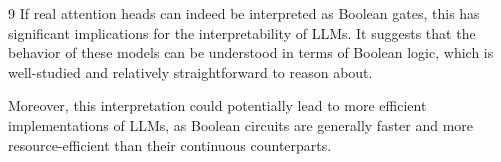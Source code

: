 \documentclass[11pt]{article}
\theoremstyle{definition}
\begin{document}
\begin{thebibliography}{9}
If real attention heads can indeed be interpreted as Boolean gates, this has significant implications for the interpretability of LLMs. It suggests that the behavior of these models can be understood in terms of Boolean logic, which is well-studied and relatively straightforward to reason about.













Moreover, this interpretation could potentially lead to more efficient implementations of LLMs, as Boolean circuits are generally faster and more resource-efficient than their continuous counterparts.











































































\end{thebibliography}
\end{document}
